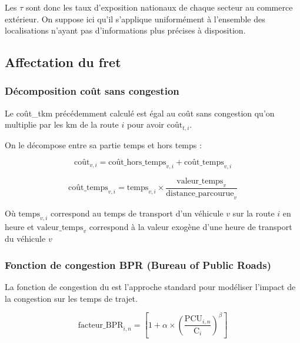 \documentclass[12pt,a4paper,french]{report}
\begin{document}
	Les $\tau$ sont donc les taux d'exposition nationaux de chaque secteur au commerce extérieur. On suppose ici qu'il s'applique uniformément à l'ensemble des localisations n'ayant pas d'informations plus précises à disposition.

	
	\subsection{Affectation du fret}
	\label{subsec:affectation_fret}
	
	\subsubsection{Décomposition coût sans congestion}
	\label{subsubsec:decompo_cout}
	
	Le coût\_tkm précédemment calculé est égal au coût sans congestion qu'on multiplie par les km de la route $i$ pour avoir $\text{coût}_{t,i}$.
	
	On le décompose entre sa partie temps et hors temps :
	
	\begin{equation}
		\text{coût}_{v,i} = \text{coût\_hors\_temps}_{v,i} + \text{coût\_temps}_{v,i}
	\end{equation}
	
	\begin{equation}
		\text{coût\_temps}_{v,i} = \text{temps}_{v,i} \times \frac{\text{valeur\_temps}_v}{\text{distance\_parcourue}_v}
	\end{equation}
	
	Où $\text{temps}_{v,i}$ correspond au temps de transport d'un véhicule $v$ sur la route $i$ en heure et $\text{valeur\_temps}_v$ correspond à la valeur exogène d'une heure de transport du véhicule $v$

	
	\subsubsection{Fonction de congestion BPR (Bureau of Public Roads)}
	\label{subsubsec:BPR}
	
	
	La fonction de congestion du \cite{BPR1964} est l'approche standard pour modéliser l'impact de la congestion sur les temps de trajet. 
	
	\begin{equation}
		\text{facteur\_BPR}_{i,n} = \left[ 1 + \alpha \times \left( \frac{\text{PCU}_{i,n}}{\text{C}_i} \right)^\beta \right]
	\end{equation}
	
\end{document}
